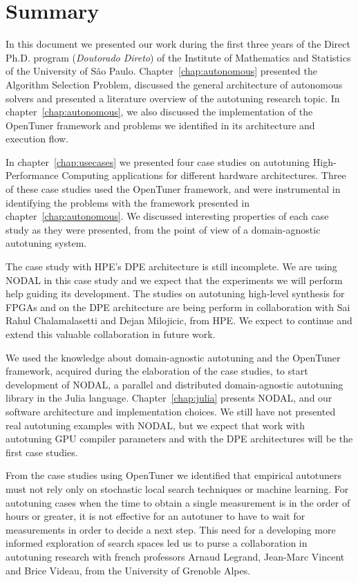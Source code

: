 \chapter{Summary}
\label{chap:final-summary}

In this document we presented our work during the first three years of the
Direct Ph.D. program (\textit{Doutorado Direto}) of the Institute of
Mathematics and Statistics of the University of São Paulo.
Chapter~\ref{chap:autonomous} presented the Algorithm Selection Problem,
discussed the general architecture of autonomous solvers and presented a
literature overview of the autotuning research topic. In
chapter~\ref{chap:autonomous}, we also discussed the implementation of the
OpenTuner framework and problems we identified in its architecture and
execution flow.

In chapter~\ref{chap:usecases} we presented four case studies on autotuning
High-Performance Computing applications for different hardware architectures.
Three of these case studies used the OpenTuner framework, and were instrumental
in identifying the problems with the framework presented in
chapter~\ref{chap:autonomous}.  We discussed interesting properties of each
case study as they were presented, from the point of view of a domain-agnostic
autotuning system.

The case study with HPE's DPE architecture is still incomplete. We are using
NODAL in this case study and we expect that the experiments we will perform
help guiding its development.  The studies on autotuning high-level synthesis
for FPGAs and on the DPE architecture are being perform in collaboration with
Sai Rahul Chalamalasetti and Dejan Milojicic, from HPE. We expect to continue
and extend this valuable collaboration in future work.

We used the knowledge about domain-agnostic autotuning and the OpenTuner
framework, acquired during the elaboration of the case studies, to start
development of NODAL, a parallel and distributed domain-agnostic autotuning
library in the Julia language. Chapter~\ref{chap:julia} presents NODAL, and our
software architecture and implementation choices. We still have not presented
real autotuning examples with NODAL, but we expect that work with autotuning
GPU compiler parameters and with the DPE architectures will be the first case
studies.

From the case studies using OpenTuner we identified that empirical autotuners
must not rely only on stochastic local search techniques or machine learning.
For autotuning cases when the time to obtain a single measurement is in the
order of hours or greater, it is not effective for an autotuner to have to wait
for measurements in order to decide a next step. This need for a developing
more informed exploration of search spaces led us to purse a collaboration in
autotuning research with french professors Arnaud Legrand, Jean-Marc Vincent
and Brice Videau, from the University of Grenoble Alpes.


